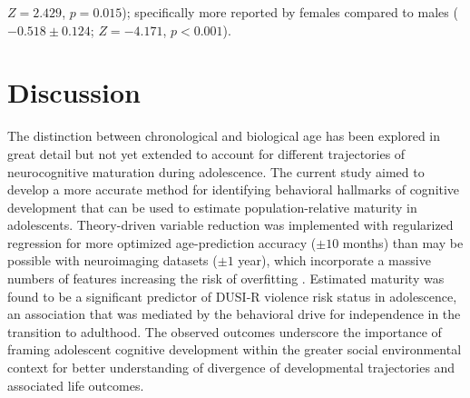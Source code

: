 \documentclass[utf8]{frontiersSCNS} %
\begin{document}
$Z=2.429$, $p=0.015$); specifically more reported by females compared to males  ($-0.518\pm0.124$;  $Z=-4.171$, $p<0.001$).
\\
\section{Discussion} The distinction between chronological and biological age has been explored in great detail but not yet extended to account for different trajectories of neurocognitive maturation during adolescence. The current study aimed to develop a more accurate method for identifying behavioral hallmarks of cognitive development that can be used to estimate population-relative maturity in adolescents. Theory-driven variable reduction was implemented with regularized regression for more optimized age-prediction accuracy ($\pm 10$ months) than may be possible with neuroimaging datasets ($\pm1$ year), which incorporate a massive numbers of features increasing the risk of overfitting \citep{cole2017predicting, franke2012brain}. Estimated maturity was found to be a significant predictor of DUSI-R violence risk status in adolescence, an association that was mediated by the behavioral drive for independence in the transition to adulthood. The observed outcomes underscore the importance of framing adolescent cognitive development within the greater social environmental context for better understanding of divergence of developmental trajectories and associated life outcomes.
\vspace{4pt}
\end{document}
